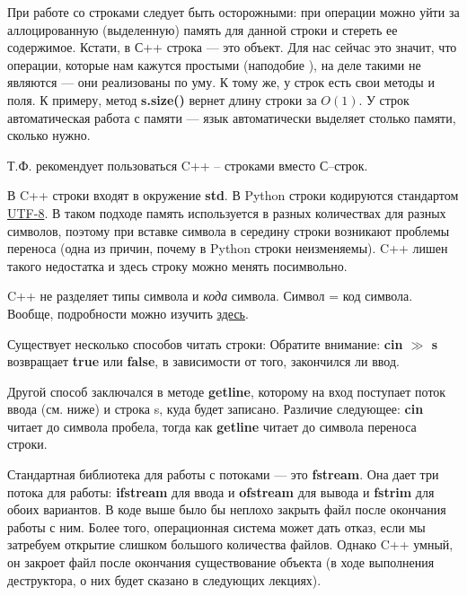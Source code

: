 \begin{lecture}[\lectureSubject]
\begin{lecSection}
		При работе со строками следует быть осторожными: при операции \fbox{+=} можно уйти за аллоцированную (выделенную) память для данной строки и стереть ее содержимое. Кстати, в С++ строка --- это объект. Для нас сейчас это значит, что операции, которые нам кажутся простыми (наподобие \fbox{+=}), на деле такими не являются --- они реализованы по уму. К тому же, у строк есть свои методы и поля. К примеру, метод \textbf{s.size()} вернет длину строки за $O(1)$. У строк автоматическая работа с памяти --- язык автоматически выделяет столько памяти, сколько нужно.
		
		Т.Ф. рекомендует пользоваться C++ -- строками вместо С--строк.
	\end{lecSection}
	\begin{lecSection}[C++\, -- строки]
		В C++ строки входят в окружение \textbf{std}.
		В Python строки кодируются стандартом \underline{UTF-8}. В таком подходе память используется в разных количествах для разных символов, поэтому при вставке символа в середину строки возникают проблемы переноса (одна из причин, почему в Python строки неизменяемы). C++ лишен такого недостатка и здесь строку можно менять посимвольно.
		
		C++ не разделяет типы символа и \textit{кода} символа. Символ = код символа. Вообще, подробности можно изучить \href{http://cplusplus.com}{здесь}.
	\end{lecSection}
	
	\begin{lecSection}
		Существует несколько способов читать строки:
		Обратите внимание: \textbf{cin $\gg$ s} возвращает \textbf{true} или \textbf{false}, в зависимости от того, закончился ли ввод.
		
		Другой способ заключался в методе \textbf{getline}, которому на вход поступает поток ввода (см. ниже) и строка s, куда будет записано. Различие следующее: \textbf{cin} читает до символа пробела, тогда как \textbf{getline} читает до символа переноса строки.
	\end{lecSection}
	\begin{lecSection}
		Стандартная библиотека для работы с потоками --- это \textbf{fstream}. Она дает три потока для работы: \textbf{ifstream} для ввода и \textbf{ofstream} для вывода и \textbf{fstrim} для обоих вариантов.
		В коде выше было бы неплохо закрыть файл после окончания работы с ним. Более того, операционная система может дать отказ, если мы затребуем открытие слишком большого количества файлов. Однако C++ умный, он закроет файл после окончания существование объекта (в ходе выполнения деструктора, о них будет сказано в следующих лекциях).
		

\end{lecSection}
\end{lecture}

